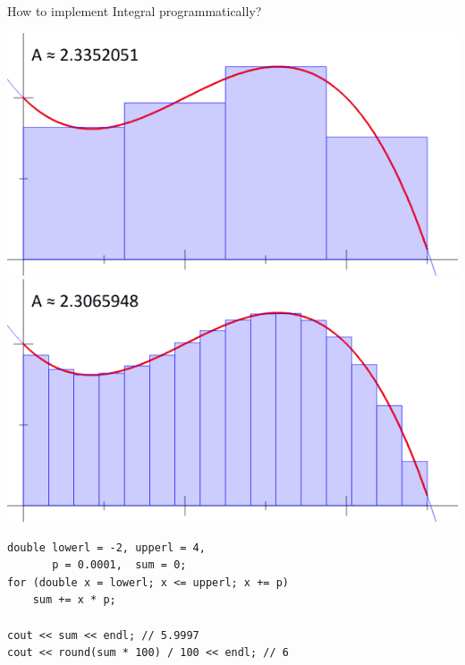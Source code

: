 \documentclass[xcolor={rgb}]{beamer}
\begin{document}
\begin{frame}[fragile,c]{How to implement Integral programmatically?}
\begin{overprint}
			\includegraphics[width=\textwidth]{assets/int-3.png}
			\onslide<6>
			\includegraphics[width=\textwidth]{assets/int-4.png}

			\vspace*{1cm}
			\begin{verbatim}
double lowerl = -2, upperl = 4,
       p = 0.0001,  sum = 0;
for (double x = lowerl; x <= upperl; x += p)
	sum += x * p;

cout << sum << endl; // 5.9997
cout << round(sum * 100) / 100 << endl; // 6
			\end{verbatim}
		\end{overprint}
	\end{frame}
\end{document}

